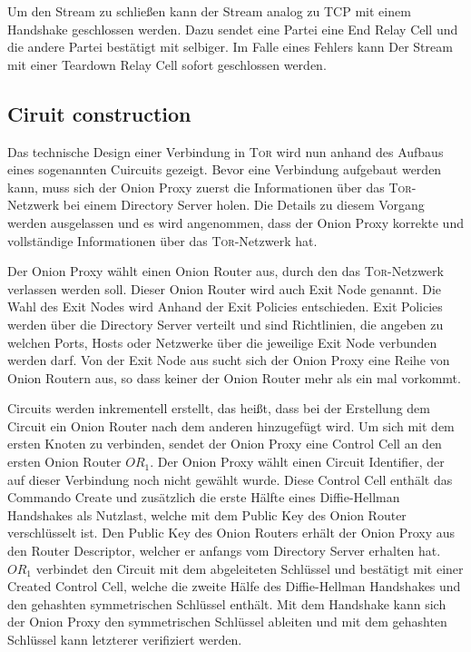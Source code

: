 \documentclass[fleqn,envcountsame,runningheads,10pt,a4paper]{llncs}
\begin{document}
Um den Stream zu schließen kann der Stream analog zu TCP mit einem Handshake geschlossen werden. Dazu sendet eine Partei eine End Relay Cell und die andere Partei bestätigt mit selbiger. Im Falle eines Fehlers kann Der Stream mit einer Teardown Relay Cell sofort geschlossen werden.

\subsection{Ciruit construction}

Das technische Design einer Verbindung in \textsc{Tor} wird nun anhand des Aufbaus eines sogenannten Cuircuits gezeigt. Bevor eine Verbindung aufgebaut werden kann, muss sich der Onion Proxy zuerst die Informationen über das \textsc{Tor}-Netzwerk bei einem Directory Server holen. Die Details zu diesem Vorgang werden ausgelassen und es wird angenommen, dass der Onion Proxy korrekte und vollständige Informationen über das \textsc{Tor}-Netzwerk hat.

Der Onion Proxy wählt einen Onion Router aus, durch den das \textsc{Tor}-Netzwerk verlassen werden soll. Dieser Onion Router wird auch Exit Node genannt. Die Wahl des Exit Nodes wird Anhand der Exit Policies entschieden. Exit Policies werden über die Directory Server verteilt und sind Richtlinien, die angeben zu welchen Ports, Hosts oder Netzwerke über die jeweilige Exit Node verbunden werden darf. Von der Exit Node aus sucht sich der Onion Proxy eine Reihe von Onion Routern aus, so dass keiner der Onion Router mehr als ein mal vorkommt.

Circuits werden inkrementell erstellt, das heißt, dass bei der Erstellung dem Circuit ein Onion Router nach dem anderen hinzugefügt wird. Um sich mit dem ersten Knoten zu verbinden, sendet der Onion Proxy eine Control Cell an den ersten Onion Router $\textit{OR}_1$. Der Onion Proxy wählt einen Circuit Identifier, der auf dieser Verbindung noch nicht gewählt wurde. Diese Control Cell enthält das Commando Create und zusätzlich die erste Hälfte eines Diffie-Hellman Handshakes als Nutzlast, welche mit dem Public Key des Onion Router verschlüsselt ist. Den Public Key des Onion Routers erhält der Onion Proxy aus den Router Descriptor, welcher er anfangs vom Directory Server erhalten hat. $\textit{OR}_1$ verbindet den Circuit mit dem abgeleiteten Schlüssel und  bestätigt mit einer Created Control Cell, welche die zweite Hälfe des Diffie-Hellman Handshakes und den gehashten symmetrischen Schlüssel enthält. Mit dem Handshake kann sich der Onion Proxy den symmetrischen Schlüssel ableiten und mit dem gehashten Schlüssel kann letzterer verifiziert werden.
\end{document}
